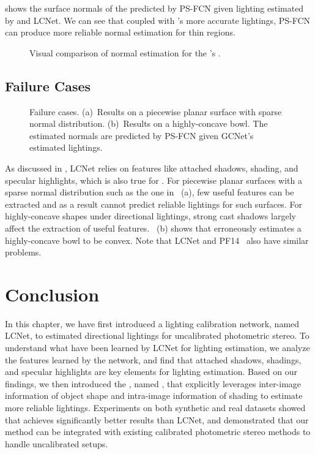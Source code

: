  shows the surface normals of the  predicted by PS-FCN given lighting estimated by \gcnetacronym and LCNet. We can see that coupled with \gcnetacronym's more accurate lightings, PS-FCN can produce more reliable normal estimation for thin regions.

\begin{figure}[htbp] \centering
    
    \caption{Visual comparison of normal estimation for the \lightstage's .} \label{fig:qual_lightstage}
\end{figure}

\subsection{Failure Cases}
\begin{figure}[htbp] \centering
    \caption[Failure cases]{Failure cases. (a)~Results on a piecewise planar surface with sparse normal distribution. (b)~Results on a highly-concave bowl. The estimated normals are predicted by PS-FCN given GCNet's estimated lightings.} %
	\label{fig:failure}  
	
\end{figure}

As discussed in , LCNet relies on features like attached shadows, shading, and specular highlights, which is also true for \gcnetacronym. 
For piecewise planar surfaces with a sparse normal distribution such as the one in ~(a), few useful features can be extracted and as a result \gcnetacronym cannot predict reliable lightings for such surfaces.
For highly-concave shapes under directional lightings, strong cast shadows largely affect the extraction of useful features.
~(b) shows that \gcnetacronym erroneously estimates a highly-concave bowl to be convex.
Note that LCNet and PF14~\cite{papad14closed} also have similar problems.

\section{Conclusion}
In this chapter, we have first introduced a lighting calibration network, named LCNet, to estimated directional lightings for uncalibrated photometric stereo.
To understand what have been learned by LCNet for lighting estimation, we analyze the features learned by the network, and find that attached shadows, shadings, and specular highlights are key elements for lighting estimation. 
Based on our findings, we then introduced the \gcnetname, named \gcnetacronym, that explicitly leverages inter-image information of object shape and intra-image information of shading to estimate more reliable lightings.
Experiments on both synthetic and real datasets showed that \gcnetacronym achieves significantly better results than LCNet, and demonstrated that our method can be integrated with existing calibrated photometric stereo methods to handle uncalibrated setups.
